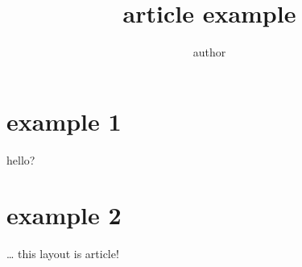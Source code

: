 \documentclass[a4paper,11pt]{article}
\author{author}
\title{article example}
\begin{document}
 
\maketitle 
\tableofcontents 
\section{example 1} hello?
\section{example 2} 
\ldots{} this layout is article!
\end{document}
